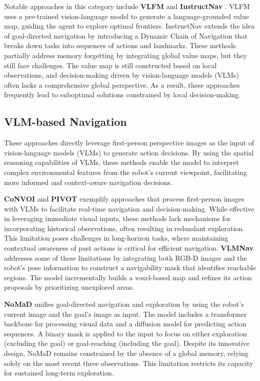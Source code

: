 Notable approaches in this category include 
\textbf{VLFM} \citep{yokoyama2024vlfm} and \textbf{InstructNav} \citep{long2024instructnav}. VLFM uses a pre-trained vision-language model to generate a language-grounded value map, guiding the agent to explore optimal frontiers. InstructNav extends the idea of goal-directed navigation by introducing a Dynamic Chain of Navigation that breaks down tasks into sequences of actions and landmarks. These methods partially address memory forgetting by integrating global value maps, but they still face challenges. The value map is still constructed based on local observations, and decision-making driven by vision-language models (VLMs) often lacks a comprehensive global perspective. As a result, these approaches frequently lead to suboptimal solutions constrained by local decision-making.

\subsection{VLM-based Navigation}
These approaches directly leverage first-person perspective images as the input of vision-language models (VLMs) to generate action decisions. By using the spatial reasoning capabilities of VLMs, these methods enable the model to interpret complex environmental features from the robot’s current viewpoint, facilitating more informed and context-aware navigation decisions.

\textbf{CoNVOI} \citep{sathyamoorthy2024convoi} and \textbf{PIVOT} \citep{nasiriany2024pivot} exemplify approaches that process first-person images with VLMs to facilitate real-time navigation and decision-making. While effective in leveraging immediate visual inputs, these methods lack mechanisms for incorporating historical observations, often resulting in redundant exploration. This limitation poses challenges in long-horizon tasks, where maintaining contextual awareness of past actions is critical for efficient navigation.
\textbf{VLMNav} \citep{goetting2024end} addresses some of these limitations by integrating both RGB-D images and the robot’s pose information to construct a navigability mask that identifies reachable regions. The model incrementally builds a voxel-based map and refines its action proposals by prioritizing unexplored areas.

\textbf{NoMaD} \citep{sridhar2024nomad} unifies goal-directed navigation and exploration by using the robot's current image and the goal's image as input. The model includes a transformer backbone for processing visual data and a diffusion model for predicting action sequences. A binary mask is applied to the input to focus on either exploration (excluding the goal) or goal-reaching (including the goal). Despite its innovative design, NoMaD remains constrained by the absence of a global memory, relying solely on the most recent three observations. This limitation restricts its capacity for sustained long-term exploration.


